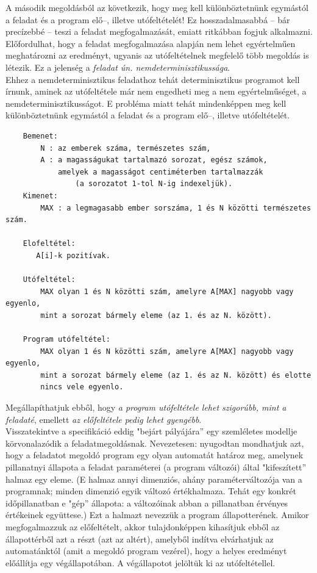 \documentclass[12pt,margin=0px]{article}
\begin{document}
    \noindent A második megoldásból az következik, hogy meg kell különböztetnünk egymástól a feladat és a program elő–, illetve utófeltételét! Ez hosszadalmasabbá – bár precízebbé – teszi a feladat megfogalmazását, emiatt ritkábban fogjuk alkalmazni.\\
	
    \noindent Előfordulhat, hogy a feladat megfogalmazása alapján nem lehet egyértelműen meghatározni az eredményt, ugyanis az utófeltételnek megfelelő több megoldás is létezik. Ez a jelenség a \emph{feladat ún. nemdeterminisztikussága}. \\

    \noindent Ehhez a nemdeterminisztikus feladathoz tehát determinisztikus programot kell írnunk, aminek az utófeltétele már nem engedheti meg a nem egyértelműséget, a nemdeterminisztikusságot. E probléma miatt tehát mindenképpen meg kell különböztetnünk egymástól a feladat és a program elő–, illetve utófeltételét.
	\newpage
	\begin{verbatim}
	Bemenet:
    	N : az emberek száma, természetes szám,
    	A : a magasságukat tartalmazó sorozat, egész számok,
        	amelyek a magasságot centiméterben tartalmazzák
                (a sorozatot 1-tol N-ig indexeljük).
	Kimenet:	
    	MAX : a legmagasabb ember sorszáma, 1 és N közötti természetes szám.
	
	Elofeltétel:
	   A[i]-k pozitívak.
	
   	Utófeltétel: 	
     	MAX olyan 1 és N közötti szám, amelyre A[MAX] nagyobb vagy egyenlo, 	
	    mint a sorozat bármely eleme (az 1. és az N. között).
	
	Program utófeltétel: 	
	   	MAX olyan 1 és N közötti szám, amelyre A[MAX] nagyobb vagy egyenlo, 	
	   	mint a sorozat bármely eleme (az 1. és az N. között) és elotte
	   	nincs vele egyenlo.
	\end{verbatim}
	
	\noindent Megállapíthatjuk ebből, hogy \emph{a program utófeltétele lehet szigorúbb, mint a feladaté}, emellett \emph{az előfeltétele pedig lehet gyengébb}.\\
	
    \noindent Visszatekintve a specifikáció eddig "bejárt pályájára” egy szemléletes modellje körvonalazódik a feladatmegoldásnak. Nevezetesen: nyugodtan mondhatjuk azt, hogy a feladatot megoldó program egy olyan automatát határoz meg, amelynek pillanatnyi állapota a feladat paraméterei (a program változói) által "kifeszített” halmaz egy eleme. (E halmaz annyi dimenziós, ahány paraméterváltozója van a programnak; minden dimenzió egyik változó értékhalmaza. Tehát egy konkrét időpillanatban e "gép” állapota: a változóinak abban a pillanatban érvényes értékeinek együttese.) Ezt a halmazt nevezzük a program állapotterének. Amikor megfogalmazzuk az előfeltételt, akkor tulajdonképpen kihasítjuk ebből az állapottérből azt a részt (azt az altért), amelyből indítva elvárhatjuk az automatánktól (amit a megoldó program vezérel), hogy a helyes eredményt előállítja egy végállapotában. A végállapotot jelöltük ki az utófeltétellel.\\
	
\end{document}
